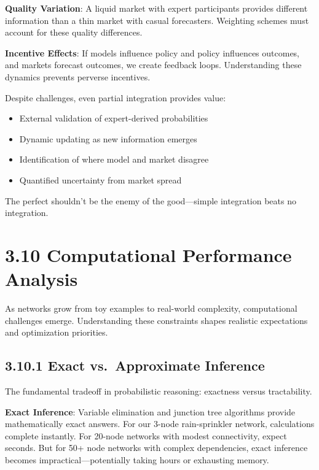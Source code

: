 \documentclass[
  11pt,
  letterpaper,
  openany]{book}
\providecommand{\tightlist}{%
  \setlength{\itemsep}{0pt}\setlength{\parskip}{0pt}}
\begin{document}
\textbf{Quality Variation}: A liquid market with expert participants
provides different information than a thin market with casual
forecasters. Weighting schemes must account for these quality
differences.

\textbf{Incentive Effects}: If models influence policy and policy
influences outcomes, and markets forecast outcomes, we create feedback
loops. Understanding these dynamics prevents perverse incentives.

Despite challenges, even partial integration provides value:

\begin{itemize}
\tightlist
\item
  External validation of expert-derived probabilities
\item
  Dynamic updating as new information emerges
\item
  Identification of where model and market disagree
\item
  Quantified uncertainty from market spread
\end{itemize}

The perfect shouldn't be the enemy of the good---simple integration
beats no integration.

\section{3.10 Computational Performance
Analysis}\label{sec-computational-performance-analysis}

As networks grow from toy examples to real-world complexity,
computational challenges emerge. Understanding these constraints shapes
realistic expectations and optimization priorities.

\subsection{3.10.1 Exact vs.~Approximate
Inference}\label{sec-exact-approximate}

The fundamental tradeoff in probabilistic reasoning: exactness versus
tractability.

\textbf{Exact Inference}: Variable elimination and junction tree
algorithms provide mathematically exact answers. For our 3-node
rain-sprinkler network, calculations complete instantly. For 20-node
networks with modest connectivity, expect seconds. But for 50+ node
networks with complex dependencies, exact inference becomes
impractical---potentially taking hours or exhausting memory.
\end{document}
